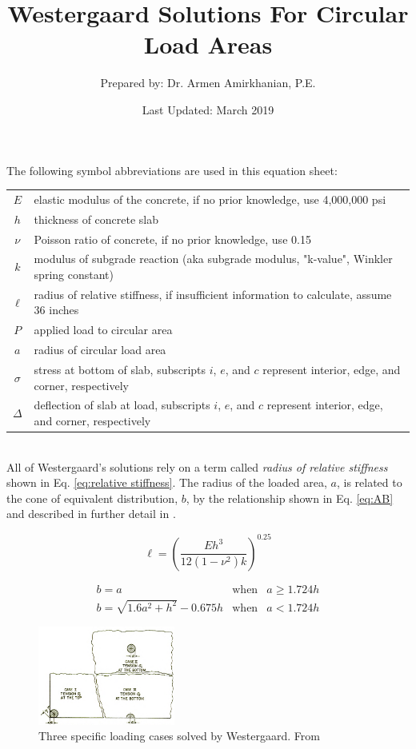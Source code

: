 \documentclass[notitlepage,letterpaper,fleqn]{report}
\title{Westergaard Solutions For Circular Load Areas}
\author{Prepared by: Dr. Armen Amirkhanian, P.E.}
\date{Last Updated: March 2019}
\begin{document}
\maketitle
The following symbol abbreviations are used in this equation sheet:

\begin{tabular}{cp{}}
  $E$ & elastic modulus of the concrete, if no prior knowledge, use 4,000,000 psi \\
  $h$ & thickness of concrete slab \\
  $\nu$ & Poisson ratio of concrete, if no prior knowledge, use 0.15 \\
  $k$ & modulus of subgrade reaction (aka subgrade modulus, "k-value", Winkler spring constant) \\
  $\ell$ & radius of relative stiffness, if insufficient information to calculate, assume 36 inches\\
  $P$ & applied load to circular area\\
  $a$ & radius of circular load area\\
  $\sigma$ & stress at bottom of slab, subscripts $i$, $e$, and $c$ represent interior, edge, and corner, respectively\\
  $\Delta$ & deflection of slab at load, subscripts $i$, $e$, and $c$ represent interior, edge, and corner, respectively
\end{tabular}\\

All of Westergaard's solutions rely on a term called \textit{radius of relative stiffness} \cite{HM1926} shown in Eq. \ref{eq:relative stiffness}. The radius of the loaded area, $a$, is related to the cone of equivalent distribution, $b$, by the relationship shown in Eq. \ref{eq:AB} and described in further detail in \cite{HM1926}. 

\begin{equation}
\ell=\left(\dfrac{Eh^{3}}{12\left(1-\nu^{2}\right)k}\right)^{0.25}
\label{eq:relative stiffness}
\end{equation}

\begin{equation}
\begin{matrix}
b=a & \mathrm{when}  & a\geq 1.724h \\ 
b=\sqrt{1.6a^2+h^2}-0.675h & \mathrm{when}  & a < 1.724h 
\end{matrix}
\label{eq:AB}
\end{equation}

\begin{figure}
    \centering
    \includegraphics[width=0.4\textwidth]{wes-loading.png}
    \caption{Three specific loading cases solved by Westergaard. From \cite{HM1926}}
    \label{fig:wesload}
\end{figure}
\end{document}
